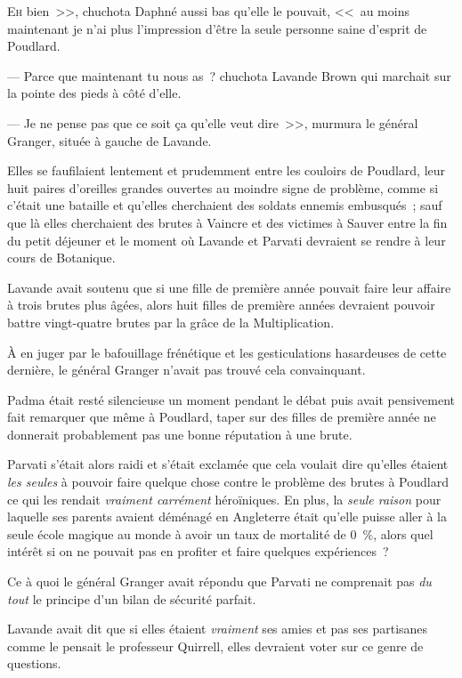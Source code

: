 
\lettrine[ante=<<~]{E}{h} bien~>>, chuchota Daphné aussi bas qu'elle le pouvait, <<~au moins maintenant je n'ai plus l'impression d'être la seule personne saine d'esprit de Poudlard.

--- Parce que maintenant tu nous as~? chuchota Lavande Brown qui marchait sur la pointe des pieds à côté d'elle.

--- Je ne pense pas que ce soit ça qu'elle veut dire~>>, murmura le général Granger, située à gauche de Lavande.

Elles se faufilaient lentement et prudemment entre les couloirs de Poudlard, leur huit paires d'oreilles grandes ouvertes au moindre signe de problème, comme si c'était une bataille et qu'elles cherchaient des soldats ennemis embusqués~; sauf que là elles cherchaient des brutes à Vaincre et des victimes à Sauver entre la fin du petit déjeuner et le moment où Lavande et Parvati devraient se rendre à leur cours de Botanique.

Lavande avait soutenu que si une fille de première année pouvait faire leur affaire à trois brutes plus âgées, alors huit filles de première années devraient pouvoir battre vingt-quatre brutes par la grâce de la Multiplication.

À en juger par le bafouillage frénétique et les gesticulations hasardeuses de cette dernière, le général Granger n'avait pas trouvé cela convainquant.

Padma était resté silencieuse un moment pendant le débat puis avait pensivement fait remarquer que même à Poudlard, taper sur des filles de première année ne donnerait probablement pas une bonne réputation à une brute.

Parvati s'était alors raidi et s'était exclamée que cela voulait dire qu'elles étaient \emph{les seules} à pouvoir faire quelque chose contre le problème des brutes à Poudlard ce qui les rendait \emph{vraiment carrément} héroïniques. En plus, la \emph{seule raison} pour laquelle ses parents avaient déménagé en Angleterre était qu'elle puisse aller à la seule école magique au monde à avoir un taux de mortalité de 0~\%, alors quel intérêt si on ne pouvait pas en profiter et faire quelques expériences~?

Ce à quoi le général Granger avait répondu que Parvati ne comprenait pas \emph{du tout} le principe d'un bilan de sécurité parfait.

Lavande avait dit que si elles étaient \emph{vraiment} ses amies et pas ses partisanes comme le pensait le professeur Quirrell, elles devraient voter sur ce genre de questions.

